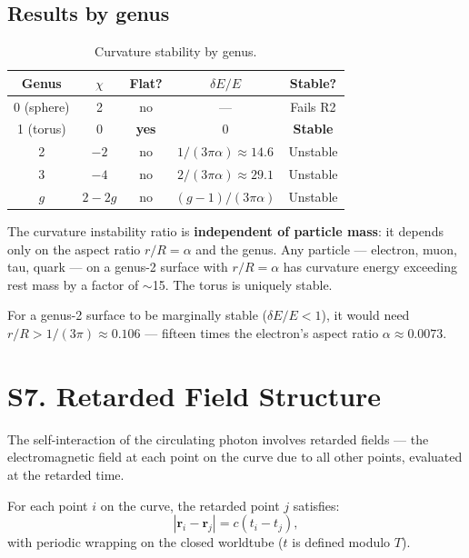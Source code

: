 \documentclass[11pt,a4paper]{article}
\begin{document}
\subsection{Results by genus}

\begin{table}[h]
\centering
\begin{tabular}{@{}ccccc@{}}
\toprule
Genus & $\chi$ & Flat? & $\delta E / E$ & Stable? \\
\midrule
0 (sphere) & 2 & no & --- & Fails R2 \\
1 (torus) & 0 & \textbf{yes} & 0 & \textbf{Stable} \\
2 & $-2$ & no & $1/(3\pi\alpha) \approx 14.6$ & Unstable \\
3 & $-4$ & no & $2/(3\pi\alpha) \approx 29.1$ & Unstable \\
$g$ & $2-2g$ & no & $(g-1)/(3\pi\alpha)$ & Unstable \\
\bottomrule
\end{tabular}
\caption{Curvature stability by genus.}
\label{tab:genus-stability}
\end{table}

The curvature instability ratio is \textbf{independent of particle mass}: it depends only on the aspect ratio $r/R = \alpha$ and the genus. Any particle --- electron, muon, tau, quark --- on a genus-2 surface with $r/R = \alpha$ has curvature energy exceeding rest mass by a factor of $\sim$15. The torus is uniquely stable.

For a genus-2 surface to be marginally stable ($\delta E / E < 1$), it would need $r/R > 1/(3\pi) \approx 0.106$ --- fifteen times the electron's aspect ratio $\alpha \approx 0.0073$.

\section{S7. Retarded Field Structure}
\label{sec:S7}

The self-interaction of the circulating photon involves retarded fields --- the electromagnetic field at each point on the curve due to all other points, evaluated at the retarded time.

For each point $i$ on the curve, the retarded point $j$ satisfies:
\begin{equation}
  |\mathbf{r}_i - \mathbf{r}_j| = c(t_i - t_j),
\end{equation}
with periodic wrapping on the closed worldtube ($t$ is defined modulo $T$).
\end{document}
